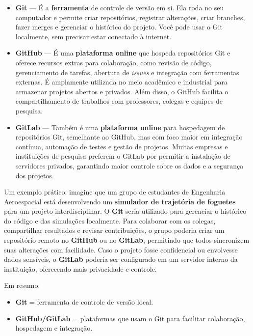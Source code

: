 \begin{itemize}
    \item \textbf{Git} — É a \textbf{ferramenta} de controle de versão em si. Ela roda no seu computador e permite criar repositórios, registrar alterações, criar branches, fazer merges e gerenciar o histórico do projeto. Você pode usar o Git localmente, sem precisar estar conectado à internet.

    \item \textbf{GitHub} — É uma \textbf{plataforma online} que hospeda repositórios Git e oferece recursos extras para colaboração, como revisão de código, gerenciamento de tarefas, abertura de \textit{issues} e integração com ferramentas externas. É amplamente utilizada no meio acadêmico e industrial para armazenar projetos abertos e privados. Além disso, o GitHub facilita o compartilhamento de trabalhos com professores, colegas e equipes de pesquisa.

    \item \textbf{GitLab} — Também é uma \textbf{plataforma online} para hospedagem de repositórios Git, semelhante ao GitHub, mas com foco maior em integração contínua, automação de testes e gestão de projetos. Muitas empresas e instituições de pesquisa preferem o GitLab por permitir a instalação de servidores privados, garantindo maior controle sobre os dados e a segurança dos projetos.
\end{itemize}

Um exemplo prático: imagine que um grupo de estudantes de Engenharia Aeroespacial está desenvolvendo um \textbf{simulador de trajetória de foguetes} para um projeto interdisciplinar. O \textbf{Git} seria utilizado para gerenciar o histórico do código e das simulações localmente. Para colaborar com os colegas, compartilhar resultados e revisar contribuições, o grupo poderia criar um repositório remoto no \textbf{GitHub} ou no \textbf{GitLab}, permitindo que todos sincronizem suas alterações com facilidade. Caso o projeto fosse confidencial ou envolvesse dados sensíveis, o \textbf{GitLab} poderia ser configurado em um servidor interno da instituição, oferecendo mais privacidade e controle.

Em resumo:
\begin{itemize}
    \item \textbf{Git} = ferramenta de controle de versão local.
    \item \textbf{GitHub/GitLab} = plataformas que usam o Git para facilitar colaboração, hospedagem e integração.
\end{itemize}

